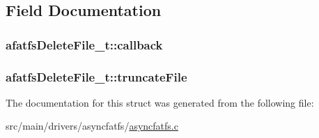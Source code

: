\subsection{Field Documentation}
\hypertarget{structafatfsDeleteFile__t_a5b5fdfdf6b2e0c1f9c108a4488efe6e0}{
\subsubsection[{callback}]{ afatfs\+Delete\+File\+\_\+t\+::callback}}\label{structafatfsDeleteFile__t_a5b5fdfdf6b2e0c1f9c108a4488efe6e0}
\hypertarget{structafatfsDeleteFile__t_a4ac22a609fe0837febbc8333a77e48a1}{
\subsubsection[{truncate\+File}]{ afatfs\+Delete\+File\+\_\+t\+::truncate\+File}}\label{structafatfsDeleteFile__t_a4ac22a609fe0837febbc8333a77e48a1}


The documentation for this struct was generated from the following file\+:\begin{DoxyCompactItemize}
\item 
src/main/drivers/asyncfatfs/\hyperlink{asyncfatfs_8c}{asyncfatfs.\+c}\end{DoxyCompactItemize}

